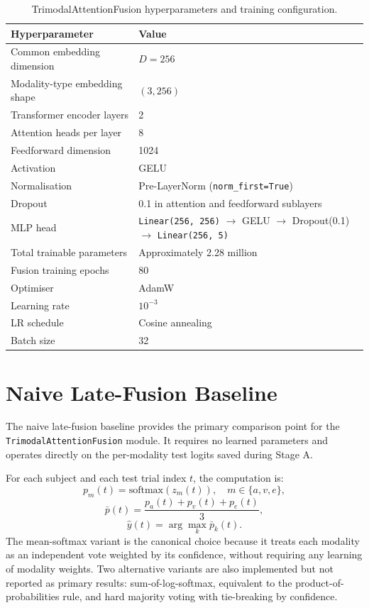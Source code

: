 \begin{table}[htbp]
\centering
\small
\caption{TrimodalAttentionFusion hyperparameters and training configuration.}
\label{tab:fusion_hyperparameters}
\begin{tabular}{p{5.4cm} p{7.8cm}}
\hline
\textbf{Hyperparameter} & \textbf{Value} \\
\hline
Common embedding dimension & $D=256$ \\
Modality-type embedding shape & $(3, 256)$ \\
Transformer encoder layers & 2 \\
Attention heads per layer & 8 \\
Feedforward dimension & 1024 \\
Activation & GELU \\
Normalisation & Pre-LayerNorm (\texttt{norm\_first=True}) \\
Dropout & 0.1 in attention and feedforward sublayers \\
MLP head & \texttt{Linear(256, 256)} $\rightarrow$ GELU $\rightarrow$ Dropout(0.1) $\rightarrow$ \texttt{Linear(256, 5)} \\
Total trainable parameters & Approximately 2.28 million \\
Fusion training epochs & 80 \\
Optimiser & AdamW \\
Learning rate & $10^{-3}$ \\
LR schedule & Cosine annealing \\
Batch size & 32 \\
\hline
\end{tabular}
\end{table}

\section{Naive Late-Fusion Baseline}
The naive late-fusion baseline provides the primary comparison point for the \texttt{TrimodalAttentionFusion} module. It requires no learned parameters and operates directly on the per-modality test logits saved during Stage A.

For each subject and each test trial index $t$, the computation is:
\begin{equation}
    p_m(t) = \mathrm{softmax}(z_m(t)), \quad m\in\{a,v,e\},
\end{equation}
\begin{equation}
    \bar{p}(t) = \frac{p_a(t)+p_v(t)+p_e(t)}{3},
\end{equation}
\begin{equation}
    \hat{y}(t) = \arg\max_k \bar{p}_k(t).
\end{equation}
The mean-softmax variant is the canonical choice because it treats each modality as an independent vote weighted by its confidence, without requiring any learning of modality weights. Two alternative variants are also implemented but not reported as primary results: sum-of-log-softmax, equivalent to the product-of-probabilities rule, and hard majority voting with tie-breaking by confidence.

